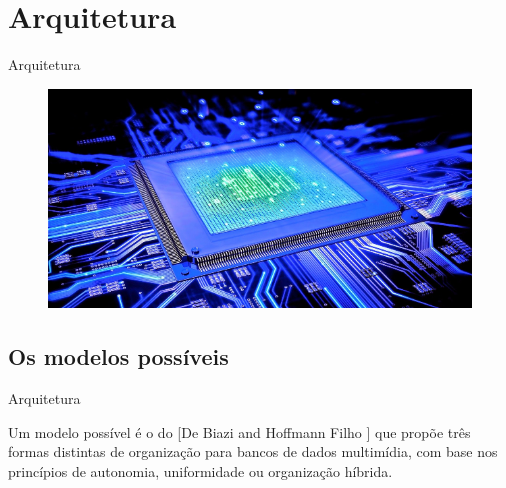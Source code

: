 \documentclass{beamer}
\begin{document}
\section{Arquitetura}
        \begin{frame}{Arquitetura}

            \begin{figure}[htpb]
                \begin{center}
                    \includegraphics[width=0.8\linewidth]{pic/Arquitetura1.png}
                \end{center}
            \end{figure}
            
        
        \end{frame}
    
    \subsection{Os modelos possíveis}
        \begin{frame}{Arquitetura}
                
            Um modelo possível é o do  [De Biazi and Hoffmann Filho ]  que propõe três formas distintas de organização para bancos de dados multimídia, com base nos princípios de autonomia, uniformidade ou organização híbrida.
            
        \end{frame}
\end{document}
